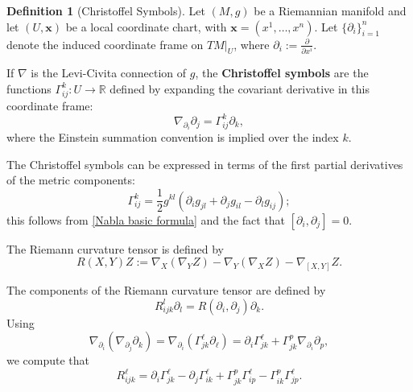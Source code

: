 \documentclass[11pt]{article}
\theoremstyle{plain}
\theoremstyle{definition}
\newtheorem{definition}[theorem]{Definition}
\theoremstyle{remark}
\begin{document}
\begin{definition}[Christoffel Symbols]
\label{def:Christoffel_symbols}
    Let $(M,g)$ be a Riemannian manifold and let $(U,\mathbf{x})$ be a
    local coordinate chart, with $\mathbf{x}=(x^1,\dots,x^n)$.  Let
    $\{\partial_i\}_{i=1}^n$ denote the induced coordinate frame on
    $TM|_U$, where $\partial_i:=\frac{\partial}{\partial x^i}$.

    If $\nabla$ is the Levi-Civita connection of $g$, the
    \textbf{Christoffel symbols} are the functions
    $\Gamma_{ij}^k:U\to\mathbb R$ defined by expanding the covariant
    derivative in this coordinate frame:
    \begin{equation}
        \nabla_{\partial_i} \partial_j = \Gamma_{ij}^k \partial_k,
    \end{equation}
    where the Einstein summation convention is implied over the index $k$.
\end{definition}

The Christoffel symbols can be expressed in terms of the first partial
derivatives of the metric components:
\begin{equation}\label{eq:ChristoffelSymbols0th}
        \Gamma_{ij}^k = \frac{1}{2} g^{kl} \left( \partial_i g_{jl} + \partial_j g_{il} - \partial_l g_{ij} \right) ;
    \end{equation}
this follows from \eqref{Nabla basic formula} and the fact that $[\partial_i,\partial_j]=0$.

The Riemann curvature tensor is defined by
\begin{equation}\label{eqn:Rm curv def}
   R(X,Y)Z := \nabla_X (\nabla_Y Z) - \nabla_Y (\nabla_X Z) - \nabla_{[X,Y]} Z .
\end{equation}

The components of the Riemann curvature tensor are defined by
\begin{equation}
    R_{ijk}^l \partial_l = R(\partial_i,\partial_j)\partial_k . 
\end{equation}
Using
\begin{equation*}
    \nabla_{\partial_i}(\nabla_{\partial_j}\partial_k) = \nabla_{\partial_i}(\Gamma_{jk}^\ell \partial_\ell) 
    = \partial_i \Gamma_{jk}^{\ell}
+ \Gamma_{jk}^p \nabla_{\partial_i}\partial_p , 
\end{equation*}
we compute that
    \begin{equation}\label{eq:Rijkl equation 0th}
        R_{ijk}^{\ell} = \partial_i \Gamma_{jk}^{\ell} - \partial_j \Gamma_{ik}^{\ell} + \Gamma_{jk}^{p}\Gamma_{ip}^{\ell} - \Gamma_{ik}^{p}\Gamma_{jp}^{\ell}.
    \end{equation}
\end{document}
